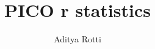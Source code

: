 \documentclass[12pt]{article}
\begin{document}
\title{PICO r statistics}
\author{Aditya Rotti}
\date{}
\maketitle


\newpage

\end{document}
